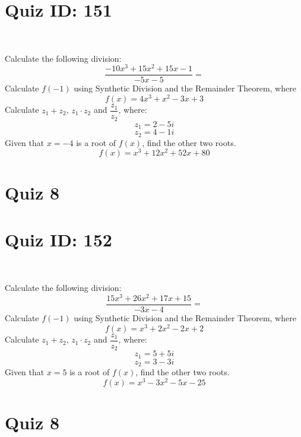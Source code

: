 \documentclass{exam}
\begin{document}
\section*{Quiz ID: 151}
\vspace{0.5cm}\
\vspace{1cm}\
\begin{questions}
\question Calculate the following division:\[\dfrac{
-10x^3 + 15x^2 + 15x - 1}{
-5x - 5}=\] \makeemptybox{\stretch{2}}
\question Calculate $f(-1)$ using Synthetic Division and the Remainder Theorem, where\[f(x) = 
4x^3 + x^2 - 3x + 3\]
\newpage\question Calculate $z_1+z_2$, $z_1\cdot z_2$ and $\dfrac{z_1}{z_2}$, where:\[z_1=2-5\mathit{i}\]\[z_2=4-1\mathit{i}\]
\question Given that $x=-4$ is a root of $f(x)$, find the other two roots.\[f(x)=
x^3 + 12x^2 + 52x + 80\]\makeemptybox{\stretch{1}}
\end{questions}\newpage
\newpage
\section*{Quiz 8}
\section*{Quiz ID: 152}
\vspace{0.5cm}\
\vspace{1cm}\
\begin{questions}
\question Calculate the following division:\[\dfrac{
15x^3 + 26x^2 + 17x + 15}{
-3x - 4}=\] 
\question Calculate $f(-1)$ using Synthetic Division and the Remainder Theorem, where\[f(x) = 
x^3 + 2x^2 - 2x + 2\]
\newpage\question Calculate $z_1+z_2$, $z_1\cdot z_2$ and $\dfrac{z_1}{z_2}$, where:\[z_1=5+5\mathit{i}\]\[z_2=3-3\mathit{i}\]\makeemptybox{\stretch{1}}
\question Given that $x=5$ is a root of $f(x)$, find the other two roots.\[f(x)=
x^3 - 3x^2 - 5x - 25\]\makeemptybox{\stretch{1}}
\end{questions}\newpage
\newpage
\section*{Quiz 8}
\end{document}
